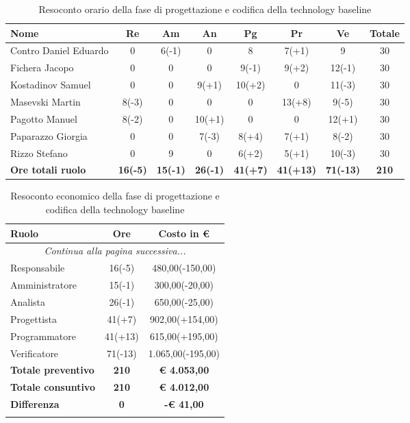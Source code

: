\documentclass[../piano_di_progetto.tex]{subfiles}
\begin{document}
\begin{table}[!ht]
	\centering
	\begin{tabular}{|l|c|c|c|c|c|c|c|}
	\hline
	\rowcolor{lightgray}
	\textbf{Nome} & \textbf{Re} & \textbf{Am} & \textbf{An} & \textbf{Pg}  & \textbf{Pr}   & \textbf{Ve} & \textbf{Totale}\\
	\hline
	Contro Daniel Eduardo & 0 & 6(-1) & 0 & 8 & 7(+1) & 9 & 30 \\
	Fichera Jacopo & 0 & 0 & 0 & 9(-1) & 9(+2) & 12(-1) & 30 \\
	Kostadinov Samuel & 0 & 0 & 9(+1) & 10(+2) & 0 & 11(-3) & 30 \\			
	Masevski Martin & 8(-3) & 0 & 0 & 0 & 13(+8) & 9(-5) & 30 \\
	Pagotto Manuel & 8(-2) & 0 & 10(+1) & 0 & 0 & 12(+1) & 30 \\			
	Paparazzo Giorgia & 0 & 0 & 7(-3) & 8(+4) & 7(+1) & 8(-2) & 30 \\
	Rizzo Stefano & 0 & 9 & 0 & 6(+2) & 5(+1) & 10(-3) & 30 \\
	\hline
	\textbf{Ore totali ruolo} & \textbf{16(-5)} & \textbf{15(-1)} & \textbf{26(-1)} & \textbf{41(+7)} & \textbf{41(+13)} & \textbf{71(-13)} & \textbf{210} \\
	\hline
	\end{tabular}
	\caption{Resoconto orario della fase di progettazione e codifica della technology baseline}
\end{table}

\begin{center}
	\begin{longtable}{|l|c|c|}
		\hline
		\rowcolor{lightgray}
		\textbf{Ruolo} & \textbf{Ore} & \textbf{Costo in €}\\
		\hline
		\endhead
		
		\hline
		\multicolumn{3}{|c|}{\emph{Continua alla pagina successiva...}}\\
		\hline
		\endfoot

		\endlastfoot
		Responsabile & 	 16(-5) 	 & 480,00(-150,00) \\
		Amministratore & 15(-1) 	 & 300,00(-20,00) \\
		Analista & 		26(-1) 	 & 650,00(-25,00) \\
		Progettista &    41(+7)   & 902,00(+154,00) \\
		Programmatore &  41(+13)   & 615,00(+195,00) \\
		Verificatore &   71(-13)  & 1.065,00(-195,00) \\
		\hline
		\textbf{Totale preventivo} & \textbf{210} & \textbf{€ 4.053,00} \\
		\hline
		\textbf{Totale consuntivo} & \textbf{210} & \textbf{€ 4.012,00} \\
		\hline
		\textbf{Differenza} & \textbf{0} & \textbf{-€ 41,00}\\
		\hline
		\rowcolor{white}
		\caption{Resoconto economico della fase di progettazione e codifica della technology baseline}
	\end{longtable}
\end{center}
\end{document}
